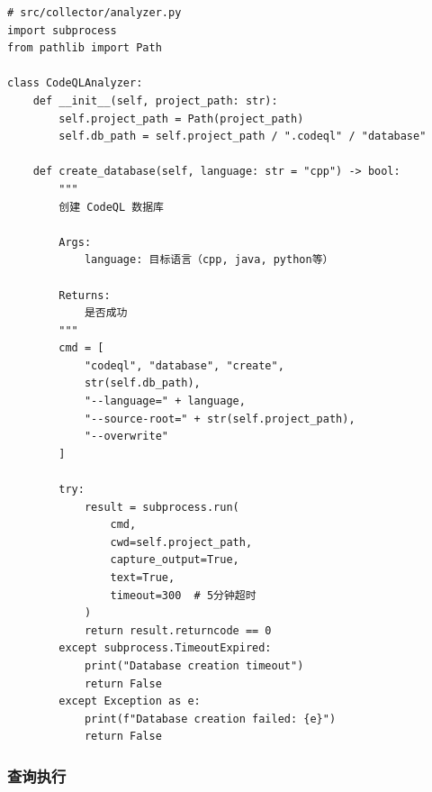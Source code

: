 \begin{lstlisting}[style=Python,abovecaptionskip=0pt,belowcaptionskip=0pt]
# src/collector/analyzer.py
import subprocess
from pathlib import Path

class CodeQLAnalyzer:
    def __init__(self, project_path: str):
        self.project_path = Path(project_path)
        self.db_path = self.project_path / ".codeql" / "database"

    def create_database(self, language: str = "cpp") -> bool:
        """
        创建 CodeQL 数据库

        Args:
            language: 目标语言（cpp, java, python等）

        Returns:
            是否成功
        """
        cmd = [
            "codeql", "database", "create",
            str(self.db_path),
            "--language=" + language,
            "--source-root=" + str(self.project_path),
            "--overwrite"
        ]

        try:
            result = subprocess.run(
                cmd,
                cwd=self.project_path,
                capture_output=True,
                text=True,
                timeout=300  # 5分钟超时
            )
            return result.returncode == 0
        except subprocess.TimeoutExpired:
            print("Database creation timeout")
            return False
        except Exception as e:
            print(f"Database creation failed: {e}")
            return False
\end{lstlisting}

\subsubsection{查询执行}

